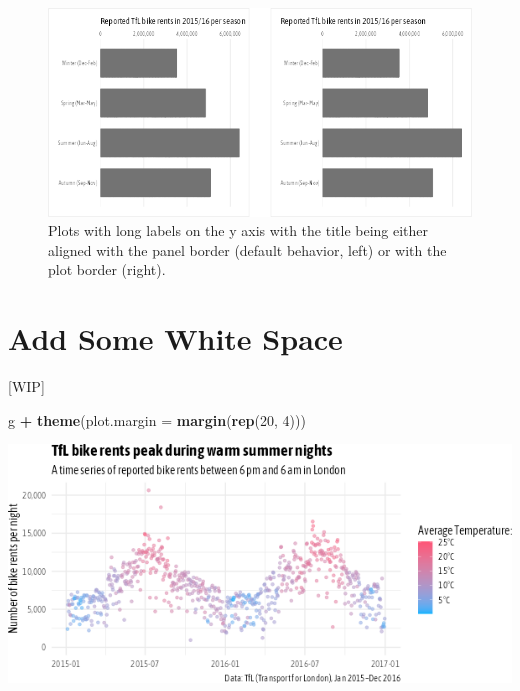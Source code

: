 \documentclass[
]{krantz}
\makeatletter
\newenvironment{Shaded}{\begin{snugshade}}{\end{snugshade}}
\newcommand{\AttributeTok}[1]{\textcolor[rgb]{0.27,0.27,0.27}{#1}}
\newcommand{\DecValTok}[1]{\textcolor[rgb]{0.06,0.06,0.06}{#1}}
\newcommand{\FunctionTok}[1]{\textcolor[rgb]{0.27,0.27,0.27}{\textbf{#1}}}
\newcommand{\NormalTok}[1]{#1}
\newcommand{\SpecialCharTok}[1]{\textcolor[rgb]{0.43,0.43,0.43}{\textbf{#1}}}
\newenvironment{kframe}{%
\medskip{}
\setlength{\fboxsep}{.8em}
 \def\at@end@of@kframe{}%
 \ifinner\ifhmode%
  \def\at@end@of@kframe{\end{minipage}}%
  \begin{minipage}{\columnwidth}%
 \fi\fi%
 \def\FrameCommand##1{\hskip\@totalleftmargin \hskip-\fboxsep
 \colorbox{shadecolor}{##1}\hskip-\fboxsep
     \hskip-\linewidth \hskip-\@totalleftmargin \hskip\columnwidth}%
 \MakeFramed {\advance\hsize-\width
   \@totalleftmargin\z@ \linewidth\hsize
   \@setminipage}}%
 {\par\unskip\endMakeFramed%
 \at@end@of@kframe}
\renewenvironment{Shaded}{\begin{kframe}}{\end{kframe}}
\makeatother
\begin{document}
\begin{figure}
\centering
\includegraphics{bookdown_files/figure-latex/05barsTitlePosition-1.png}
\caption{\label{fig:05barsTitlePosition}Plots with long labels on the y axis with the title being either aligned with the panel border (default behavior, left) or with the plot border (right).}
\end{figure}

\hypertarget{add-some-white-space}{%
\section{Add Some White Space}\label{add-some-white-space}}

{[}WIP{]}

\begin{Shaded}
\begin{Highlighting}[]
\NormalTok{g }\SpecialCharTok{+} \FunctionTok{theme}\NormalTok{(}\AttributeTok{plot.margin =} \FunctionTok{margin}\NormalTok{(}\FunctionTok{rep}\NormalTok{(}\DecValTok{20}\NormalTok{, }\DecValTok{4}\NormalTok{)))}
\end{Highlighting}
\end{Shaded}

\includegraphics{bookdown_files/figure-latex/05plotMargin-1.png}
\end{document}
